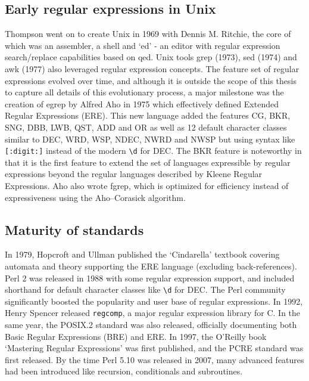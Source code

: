 \subsection{Early regular expressions in Unix}
Thompson went on to create Unix in 1969 with Dennis M. Ritchie, the core of which was an assembler, a shell and `ed' - an editor with regular expression search/replace capabilities based on qed.  Unix tools grep (1973), sed (1974) and awk (1977) also leveraged regular expression concepts.  The feature set of regular expressions evolved over time, and although it is outside the scope of this thesis to capture all details of this evolutionary process, a major milestone was the creation of egrep by Alfred Aho in 1975 which effectively defined Extended Regular Expressions (ERE).  This new language added the features CG, BKR, SNG, DBB, LWB, QST, ADD and OR as well as 12 default character classes similar to DEC, WRD, WSP, NDEC, NWRD and NWSP but using syntax like \verb![:digit:]! instead of the modern \verb!\d! for DEC.  The BKR feature is noteworthy in that it is the first feature to extend the set of languages expressible by regular expressions beyond the regular languages described by Kleene Regular Expressions. Aho also wrote fgrep, which is optimized for efficiency instead of expressiveness using the Aho–Corasick algorithm.

\subsection{Maturity of standards}
In 1979, Hopcroft and Ullman published the `Cindarella' textbook covering automata and theory supporting the ERE language (excluding back-references).  Perl 2 was released in 1988 with some regular expression support, and included shorthand for default character classes like \verb!\d! for DEC.  The Perl community significantly boosted the popularity and user base of regular expressions.  In 1992, Henry Spencer released {\tt regcomp}, a major regular expression library for C.  In the same year, the POSIX.2 standard was also released, officially documenting both Basic Regular Expressions (BRE) and ERE.  In 1997, the O'Reilly book `Mastering Regular Expressions' was first published, and the PCRE standard was first released.  By the time Perl 5.10 was released in 2007, many advanced features had been introduced like recursion, conditionals and subroutines.

